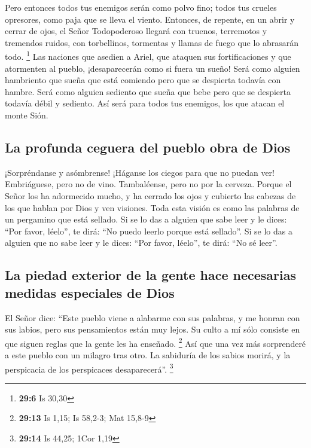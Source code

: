  Pero entonces todos tus enemigos serán como polvo fino;
todos tus crueles opresores, como paja que se lleva el viento. Entonces,
de repente, en un abrir y cerrar de ojos,  el Señor
Todopoderoso llegará con truenos, terremotos y tremendos ruidos, con
torbellinos, tormentas y llamas de fuego que lo abrasarán todo.
\footnote{\textbf{29:6} Is 30,30}  Las naciones que
asedien a Ariel, que ataquen sus fortificaciones y que atormenten al
pueblo, ¡desaparecerán como si fuera un sueño!  Será como
alguien hambriento que sueña que está comiendo pero que se despierta
todavía con hambre. Será como alguien sediento que sueña que bebe pero
que se despierta todavía débil y sediento. Así será para todos tus
enemigos, los que atacan el monte Sión.

\hypertarget{la-profunda-ceguera-del-pueblo-obra-de-dios}{%
\subsection{La profunda ceguera del pueblo obra de
Dios}\label{la-profunda-ceguera-del-pueblo-obra-de-dios}}

 ¡Sorpréndanse y asómbrense! ¡Háganse los ciegos para que
no puedan ver! Embriáguese, pero no de vino. Tambaléense, pero no por la
cerveza.  Porque el Señor los ha adormecido mucho, y ha
cerrado los ojos y cubierto las cabezas de los que hablan por Dios y ven
visiones.  Toda esta visión es como las palabras de un
pergamino que está sellado. Si se lo das a alguien que sabe leer y le
dices: ``Por favor, léelo'', te dirá: ``No puedo leerlo porque está
sellado''.  Si se lo das a alguien que no sabe leer y le
dices: ``Por favor, léelo'', te dirá: ``No sé leer''.

\hypertarget{la-piedad-exterior-de-la-gente-hace-necesarias-medidas-especiales-de-dios}{%
\subsection{La piedad exterior de la gente hace necesarias medidas
especiales de
Dios}\label{la-piedad-exterior-de-la-gente-hace-necesarias-medidas-especiales-de-dios}}

 El Señor dice: ``Este pueblo viene a alabarme con sus
palabras, y me honran con sus labios, pero sus pensamientos están muy
lejos. Su culto a mí sólo consiste en que siguen reglas que la gente les
ha enseñado. \footnote{\textbf{29:13} Is 1,15; Is 58,2-3; Mat 15,8-9}
 Así que una vez más sorprenderé a este pueblo con un
milagro tras otro. La sabiduría de los sabios morirá, y la perspicacia
de los perspicaces desaparecerá''. \footnote{\textbf{29:14} Is 44,25;
  1Cor 1,19}


